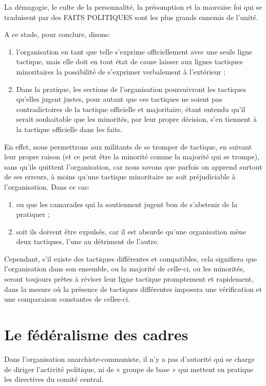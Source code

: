La démagogie, le culte de la personnalité, la présomption et la mauvaise foi qui se traduisent par des FAITS POLITIQUES sont les plus grands ennemis de l'unité.

A ce stade, pour conclure, disons:

\begin{enumerate}
\item{} l'organisation en tant que telle s'exprime officiellement avec une seule ligne tactique, mais elle doit en tout état de cause laisser aux lignes tactiques minoritaires la possibilité de s'exprimer verbalement à l'extérieur ;
\item{} Dans la pratique, les sections de l'organisation poursuivront les tactiques qu'elles jugent justes, pour autant que ces tactiques ne soient pas contradictoires de la tactique officielle et majoritaire, étant entendu qu'il serait souhaitable que les minorités, par leur propre décision, s'en tiennent à la tactique officielle dans les faits.
\end{enumerate}

En effet, nous permettrons aux militants de se tromper de tactique, en suivant leur propre raison (et ce peut être la minorité comme la majorité qui se trompe), sans qu'ils quittent l'organisation, car nous savons que parfois on apprend surtout de ses erreurs, à moins qu'une tactique minoritaire ne soit préjudiciable à l'organisation. Dans ce cas:

\begin{enumerate}
\item{} ou que les camarades qui la soutiennent jugent bon de s'abstenir de la pratiquer ;
\item{} soit ils doivent être expulsés, car il est absurde qu'une organisation mène deux tactiques, l'une au détriment de l'autre.
\end{enumerate}

Cependant, s'il existe des tactiques différentes et compatibles, cela signifiera que l'organisation dans son ensemble, ou la majorité de celle-ci, ou les minorités, seront toujours prêtes à réviser leur ligne tactique promptement et rapidement, dans la mesure où la présence de tactiques différentes imposera une vérification et une comparaison constantes de celles-ci.

\section{Le fédéralisme des cadres}

Dans l'organisation anarchiste-communiste, il n'y a pas d'autorité qui se charge de diriger l'activité politique, ni de « groupe de base » qui mettent en pratique les directives du comité central.


